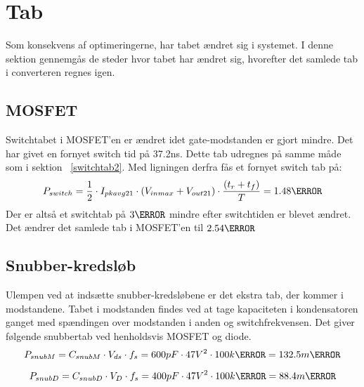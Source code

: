 \section{Tab}
Som konsekvens af optimeringerne, har tabet ændret sig i systemet. I denne sektion gennemgås de steder hvor tabet har ændret sig, hvorefter det samlede tab i converteren regnes igen.

\subsection{MOSFET}
\noindent Switchtabet i MOSFET'en er ændret idet gate-modstanden er gjort mindre. Det har givet en fornyet switch tid på 37.2ns. Dette tab udregnes på samme måde som i sektion ~\ref{switchtab2}. Med ligningen derfra fås et fornyet switch tab på:
\begin{equation}
P_{switch} = \frac{1}{2} \cdot I_{pkavg21} \cdot (V_{inmax}+V_{out21}) \cdot \frac{(t_r+t_f)}{T}= 1.48\watt
\end{equation} 
Der er altså et switchtab på $3\watt$ mindre efter switchtiden er blevet ændret. Det ændrer det samlede tab i MOSFET'en til $2.54\watt$

\subsection{Snubber-kredsløb}
\noindent Ulempen ved at indsætte snubber-kredsløbene er det ekstra tab, der kommer i modstandene. Tabet i modstanden findes ved at tage kapaciteten i kondensatoren ganget med spændingen over modstanden i anden og switchfrekvensen\cite{snubber_power}.
Det giver følgende snubbertab ved henholdsvis MOSFET og diode.
\begin{equation}
P_{snubM} = C_{snubM}\cdot V_{ds} \cdot f_s = 600pF \cdot {47V}^2 \cdot 100k\hertz = 132.5m\watt
\end{equation} 

\begin{equation}
P_{snubD} = C_{snubD}\cdot V_{D} \cdot f_s = 400pF \cdot {47V}^2 \cdot 100k\hertz = 88.4m\watt
\end{equation} 

